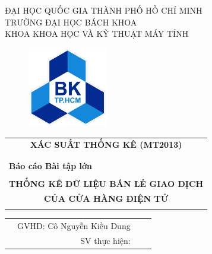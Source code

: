 \documentclass{article}
\begin{document}
\lstset{style=myStyle}
\begin{titlepage}
\begin{center}
    \large ĐẠI HỌC QUỐC GIA THÀNH PHỐ HỒ CHÍ MINH \\
    TRƯỜNG ĐẠI HỌC BÁCH KHOA \\
    KHOA KHOA HỌC VÀ KỸ THUẬT MÁY TÍNH
\end{center}

\vspace{1.5cm}

\begin{figure}[!ht]
    \centering \includegraphics[width=3.5cm]{Images/bachkhoa_logo.png}
\end{figure}

\vspace{1.5cm}

\begin{table}[H]
    \centering
    \begin{tabular}{c}
    {\bf \Large XÁC SUẤT THỐNG KÊ (MT2013)} \\ \\
    \hline  \\
    \multicolumn{1}{l}{{\bf \large Báo cáo Bài tập lớn}}    \\  \\
    {\bf \huge THỐNG KÊ DỮ LIỆU BÁN LẺ GIAO DỊCH}     \\  
    {\bf \huge  CỦA CỬA HÀNG ĐIỆN TỬ}     \\  \\
    \hline
    \end{tabular}
\end{table}

\vspace{1.5cm}

\begin{table}[h]
\centering
\begin{tabular}{lrlc}

\hspace{0 cm} & GVHD: Cô Nguyễn Kiều Dung & \vspace{0.5cm}\\
& SV thực hiện: &  
 	

\end{tabular}
\end{table}
\end{titlepage}
\end{document}
